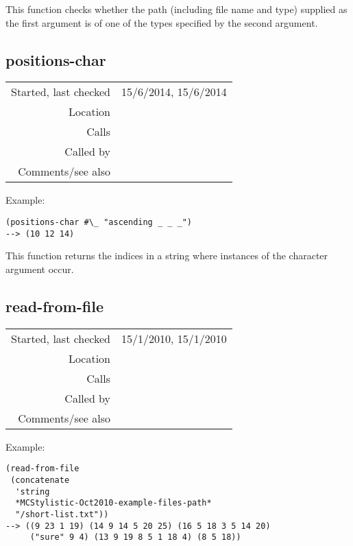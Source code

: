 \noindent This function checks whether the path
(including file name and type) supplied as the first
argument is of one of the types specified by the
second argument.


\subsection*{positions-char}\label{fun:positions-char}

\vspace{0.3cm}
\begin{tabular}{r|p{8cm}}
Started, last checked & 15/6/2014, 15/6/2014 \\
Location & \nameref{sec:text-files} \\
Calls & \\
Called by & \nameref{fun:pitch-class-sequential-expression2list} \\
Comments/see also &
\end{tabular}

\vspace{0.5cm}
\noindent Example:
\begin{verbatim}
(positions-char #\_ "ascending _ _ _")
--> (10 12 14)
\end{verbatim}

\noindent This function returns the indices in a
string where instances of the character argument
occur.


\subsection*{read-from-file}\label{fun:read-from-file}

\vspace{0.3cm}
\begin{tabular}{r|p{8cm}}
Started, last checked & 15/1/2010, 15/1/2010 \\
Location & \nameref{sec:text-files} \\
Calls & \\
Called by & \\
Comments/see also &
\end{tabular}

\vspace{0.5cm}
\noindent Example:
\begin{verbatim}
(read-from-file
 (concatenate
  'string
  *MCStylistic-Oct2010-example-files-path*
  "/short-list.txt"))
--> ((9 23 1 19) (14 9 14 5 20 25) (16 5 18 3 5 14 20)
     ("sure" 9 4) (13 9 19 8 5 1 18 4) (8 5 18))
\end{verbatim}

